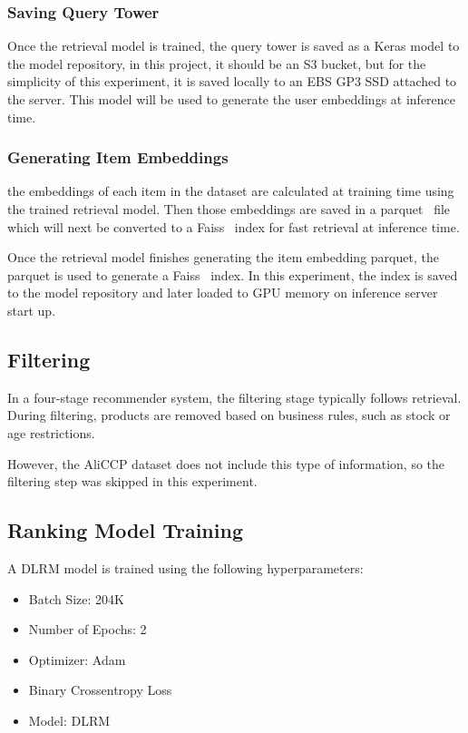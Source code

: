 \subsubsection{Saving Query Tower}

Once the retrieval model is trained, the query tower is saved as a Keras model to the model repository, 
in this project, it should be an S3 bucket, but for the simplicity of this experiment, it is saved locally to an EBS GP3 SSD attached to the server.
This model will be used to generate the user embeddings at inference time.

\subsubsection{Generating Item Embeddings}

the embeddings of each item in the dataset are calculated at training time using the trained retrieval model. 
Then those embeddings are saved in a parquet~\cite{ApacheParquet} file which will next be converted to a Faiss~\cite{Faiss} index for fast retrieval at inference time.

Once the retrieval model finishes generating the item embedding parquet,
the parquet is used to generate a Faiss~\cite{Faiss} index.
In this experiment, the index is saved to the model repository and later loaded to GPU memory on inference server start up.

\subsection{Filtering}
In a four-stage recommender system, the filtering stage typically follows retrieval.
During filtering, products are removed based on business rules, such as stock or age restrictions. 

However, the AliCCP dataset does not include this type of information, so the filtering step was skipped in this experiment.

\subsection{Ranking Model Training}

A DLRM model is trained using the following hyperparameters:

\begin{itemize}
\item Batch Size: 204K
\item Number of Epochs: 2
\item Optimizer: Adam
\item Binary Crossentropy Loss
\item Model: DLRM
\end{itemize}

